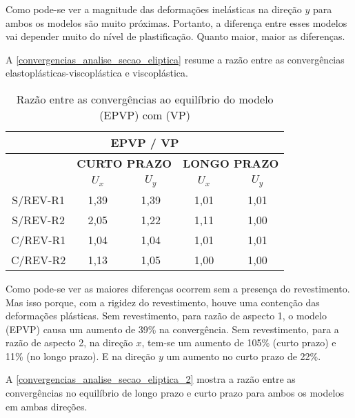 Como pode-se ver a magnitude das deformações inelásticas na direção $y$ para ambos os modelos são muito próximas. Portanto, a diferença entre esses modelos vai depender muito do nível de plastificação. Quanto maior, maior as diferenças.

A \autoref{convergencias_analise_secao_eliptica} resume a razão entre as convergências elastoplásticas-viscoplástica e viscoplástica.

\begin{table}[H]
	\caption{Razão entre as convergências ao equilíbrio do modelo (EPVP) com (VP)}
	\label{convergencias_analise_secao_eliptica}
	\centering
	\small
	\renewcommand{\arraystretch}{1.25}
	\begin{tabular}{c c c c c}
		\hline
		\multicolumn{5}{c}{\textbf{EPVP / VP}}\\	
		\hline
		\multicolumn{1}{c}{} &
		\multicolumn{2}{c}{\textbf{CURTO PRAZO}} &
		\multicolumn{2}{c}{\textbf{LONGO PRAZO}}	\\
		\multicolumn{1}{c}{} &
		\multicolumn{1}{c}{\textbf{$U_x$}} &
		\multicolumn{1}{c}{\textbf{$U_y$}} &
		\multicolumn{1}{c}{\textbf{$U_x$}} &
		\multicolumn{1}{c}{\textbf{$U_y$}} \\
		\hline
		S/REV-R1	 &	1,39 &	1,39 &	1,01 &	1,01 \\
		S/REV-R2	 &	2,05 &	1,22 &	1,11 &	1,00 \\
		C/REV-R1	 &	1,04 &	1,04 &	1,01 &	1,01 \\
		C/REV-R2	 &	1,13 &	1,05 &	1,00 &	1,00 \\
		\hline
	\end{tabular}
	\normalsize
\end{table}

Como pode-se ver as maiores diferenças ocorrem sem a presença do revestimento. Mas isso porque, com a rigidez do revestimento, houve uma contenção das deformações plásticas. Sem revestimento, para razão de aspecto 1, o modelo (EPVP) causa um aumento de 39\% na convergência. Sem revestimento, para a razão de aspecto 2, na direção $x$, tem-se um aumento de 105\% (curto prazo) e 11\% (no longo prazo). E na direção $y$ um aumento no curto prazo de 22\%.

A \autoref{convergencias_analise_secao_eliptica_2} mostra a razão entre as convergências no equilíbrio de longo prazo e curto prazo para ambos os modelos em ambas direções.

